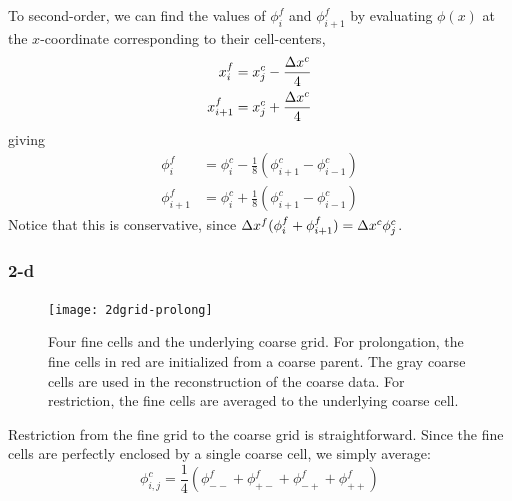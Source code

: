 To second-order, we can find the values of $\phi^f_i$ and
$\phi^f_{i+1}$  by evaluating $\phi(x)$ at the $x$-coordinate corresponding to their
cell-centers,
\begin{align}
x^f_i &= x^c_j - \frac{\Delta x^c}{4} \\
x^f_{i+1} &= x^c_j + \frac{\Delta x^c}{4}
\end{align}
giving
\begin{align}
\phi^f_i     &= \phi^c_i - \frac{1}{8} (\phi^c_{i+1} - \phi^c_{i-1}) \\
\phi^f_{i+1} &= \phi^c_i + \frac{1}{8} (\phi^c_{i+1} - \phi^c_{i-1}) 
\end{align}
Notice that this is conservative, since $\Delta x^f (\phi^f_i + \phi^f_{i+1}) = \Delta x^c \phi^c_j$.

\subsubsection{2-d}

\begin{figure}[t]
\centering
\texttt{[image: 2dgrid-prolong]}
\caption[The geometry for 2-d
  prolongation and restriction]{\label{fig:2dgrid-prolong} Four fine cells and the
  underlying coarse grid.  For prolongation, the fine cells in red are
  initialized from a coarse parent.  The gray coarse cells are used in
  the reconstruction of the coarse data.  For restriction, the fine
  cells are averaged to the underlying coarse cell.}
\end{figure}


Restriction from the fine grid to the coarse grid is straightforward.
Since the fine cells are perfectly enclosed by a single coarse cell,
we simply average:
\begin{equation}
\phi_{i,j}^c = \frac{1}{4} ( \phi_{--}^f + \phi_{+-}^f +
                             \phi_{-+}^f + \phi_{++}^f )
\end{equation}

